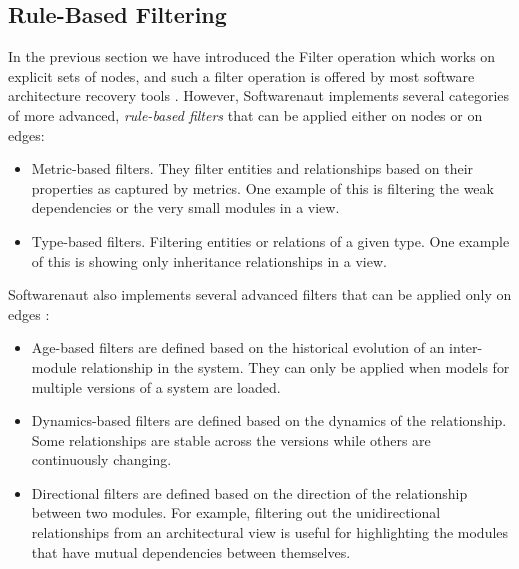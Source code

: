 \documentclass[preprint,12pt]{elsarticle}
\begin{document}
\newpage
\subsection {Rule-Based Filtering}

In the previous section we have introduced the Filter operation which works on explicit sets of nodes, and such a filter operation is offered by most software architecture recovery tools \cite{aracic-filtering}. However, Softwarenaut implements several categories of more advanced, {\em rule-based filters} that can be applied either on nodes or on edges:

\begin{itemize}
\item Metric-based filters. They filter entities and relationships based on their properties as captured by metrics. One example of this is filtering the weak dependencies or the very small modules in a view.
\item Type-based filters. Filtering entities or relations of a given type. One example of this is showing only inheritance relationships in a view.
\end{itemize}

Softwarenaut also implements several advanced filters that can be applied only on edges \cite{lungu-relevo}:

\begin{itemize}
\item Age-based filters are defined based on the historical evolution of an inter-module relationship in the system. They can only be applied when models for multiple versions of a system are loaded. %

\item Dynamics-based filters are defined based on the dynamics of the relationship. Some relationships are stable across the versions while others are continuously changing. %

\item Directional filters are defined based on the direction of the relationship between two modules. For example, filtering out the unidirectional relationships from an architectural view is useful for highlighting the modules that have mutual dependencies between themselves. 
\end{itemize}
\end{document}
